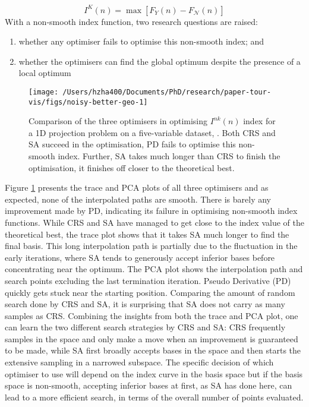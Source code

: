 \[I^{K}(n) = \max \left[F_{Y}(n) - F_{\mathcal{N}}(n)\right]\] With a
non-smooth index function, two research questions are raised:

\begin{enumerate}
\def\labelenumi{\arabic{enumi})}
\tightlist
\item
  whether any optimiser fails to optimise this non-smooth index; and
\item
  whether the optimisers can find the global optimum despite the
  presence of a local optimum
\end{enumerate}

\begin{Schunk}
\begin{figure}

{\centering \texttt{[image: /Users/hzha400/Documents/PhD/research/paper-tour-vis/figs/noisy-better-geo-1]} 

}

\caption[Comparison of the three optimisers in optimising $I^{nk}(n)$ index for a 1D projection problem on a five-variable dataset, ]{Comparison of the three optimisers in optimising $I^{nk}(n)$ index for a 1D projection problem on a five-variable dataset, . Both CRS and SA succeed in the optimisation, PD fails to optimise this non-smooth index. Further, SA takes  much longer than CRS to finish the optimisation, it finishes off closer to the theoretical best.}\label{fig:noisy-better-geo}
\end{figure}
\end{Schunk}

Figure \ref{fig:noisy-better-geo} presents the trace and PCA plots of
all three optimisers and as expected, none of the interpolated paths are
smooth. There is barely any improvement made by PD, indicating its
failure in optimising non-smooth index functions. While CRS and SA have
managed to get close to the index value of the theoretical best, the
trace plot shows that it takes SA much longer to find the final basis.
This long interpolation path is partially due to the fluctuation in the
early iterations, where SA tends to generously accept inferior bases
before concentrating near the optimum. The PCA plot shows the
interpolation path and search points excluding the last termination
iteration. Pseudo Derivative (PD) quickly gets stuck near the starting
position. Comparing the amount of random search done by CRS and SA, it
is surprising that SA does not carry as many samples as CRS. Combining
the insights from both the trace and PCA plot, one can learn the two
different search strategies by CRS and SA: CRS frequently samples in the
space and only make a move when an improvement is guaranteed to be made,
while SA first broadly accepts bases in the space and then starts the
extensive sampling in a narrowed subspace. The specific decision of
which optimiser to use will depend on the index curve in the basis space
but if the basis space is non-smooth, accepting inferior bases at first,
as SA has done here, can lead to a more efficient search, in terms of
the overall number of points evaluated.

